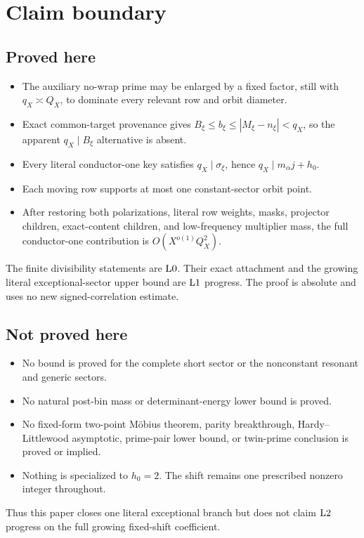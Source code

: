 \section{Claim boundary}
\label{sec:claim-boundary}

\subsection*{Proved here}

\begin{itemize}[leftmargin=2em]
\item The auxiliary no-wrap prime may be enlarged by a fixed factor,
  still with \(q_X\asymp Q_X\), to dominate every relevant row and
  orbit diameter.
\item Exact common-target provenance gives
  \(B_\xi\le b_\xi\le|M_\xi-n_\xi|<q_X\), so the apparent
  \(q_X\mid B_\xi\) alternative is absent.
\item Every literal conductor-one key satisfies
  \(q_X\mid\sigma_\xi\), hence
  \(q_X\mid m_\alpha j+h_0\).
\item Each moving row supports at most one constant-sector orbit point.
\item After restoring both polarizations, literal row weights, masks,
  projector children, exact-content children, and low-frequency
  multiplier mass, the full conductor-one contribution is
  \(O(X^{o(1)}Q_X^2)\).
\end{itemize}

The finite divisibility statements are \(\mathrm{L0}\).  Their exact
attachment and the growing literal exceptional-sector upper bound
are \(\mathrm{L1}\) progress.  The proof is absolute and uses no new
signed-correlation estimate.

\subsection*{Not proved here}

\begin{itemize}[leftmargin=2em]
\item No bound is proved for the complete short sector or the
  nonconstant resonant and generic sectors.
\item No natural post-bin mass or determinant-energy lower bound is
  proved.
\item No fixed-form two-point M\"obius theorem, parity breakthrough,
  Hardy--Littlewood asymptotic, prime-pair lower bound, or twin-prime
  conclusion is proved or implied.
\item Nothing is specialized to \(h_0=2\).  The shift remains one
  prescribed nonzero integer throughout.
\end{itemize}

Thus this paper closes one literal exceptional branch but does not
claim \(\mathrm{L2}\) progress on the full growing fixed-shift coefficient.
